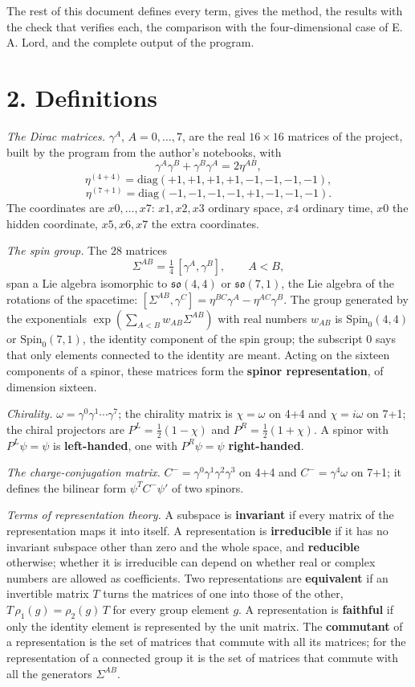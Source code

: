 \documentclass[
  10pt,
]{article}
\begin{document}
The rest of this document defines every term, gives the method, the
results with the check that verifies each, the comparison with the
four-dimensional case of E. A. Lord, and the complete output of the
program.

\hypertarget{definitions}{%
\section{2. Definitions}\label{definitions}}

\emph{The Dirac matrices.} \(\gamma^A\), \(A=0,\dots,7\), are the real
\(16\times16\) matrices of the project, built by the program from the
author's notebooks, with
\[\gamma^A\gamma^B+\gamma^B\gamma^A=2\eta^{AB},\]
\[\eta^{(4+4)}=\mathrm{diag}(+1,+1,+1,+1,-1,-1,-1,-1),\]
\[\eta^{(7+1)}=\mathrm{diag}(-1,-1,-1,-1,+1,-1,-1,-1).\] The coordinates
are \(x0,\dots,x7\): \(x1,x2,x3\) ordinary space, \(x4\) ordinary time,
\(x0\) the hidden coordinate, \(x5,x6,x7\) the extra coordinates.

\emph{The spin group.} The 28 matrices
\[\Sigma^{AB}=\tfrac14\,[\gamma^A,\gamma^B],\qquad A<B,\] span a Lie
algebra isomorphic to \(\mathfrak{so}(4,4)\) or \(\mathfrak{so}(7,1)\),
the Lie algebra of the rotations of the spacetime:
\([\Sigma^{AB},\gamma^C]=\eta^{BC}\gamma^A-\eta^{AC}\gamma^B\). The
group generated by the exponentials
\(\exp(\sum_{A<B}w_{AB}\Sigma^{AB})\) with real numbers \(w_{AB}\) is
\(\mathrm{Spin}_0(4,4)\) or \(\mathrm{Spin}_0(7,1)\), the identity
component of the spin group; the subscript 0 says that only elements
connected to the identity are meant. Acting on the sixteen components of
a spinor, these matrices form the \textbf{spinor representation}, of
dimension sixteen.

\emph{Chirality.} \(\omega=\gamma^{0}\gamma^{1}\cdots\gamma^{7}\); the
chirality matrix is \(\chi=\omega\) on 4+4 and \(\chi=i\omega\) on 7+1;
the chiral projectors are \(P^L=\tfrac12(1-\chi)\) and
\(P^R=\tfrac12(1+\chi)\). A spinor with \(P^L\psi=\psi\) is
\textbf{left-handed}, one with \(P^R\psi=\psi\) \textbf{right-handed}.

\emph{The charge-conjugation matrix.}
\(C^-=\gamma^{0}\gamma^{1}\gamma^{2}\gamma^{3}\) on 4+4 and
\(C^-=\gamma^{4}\omega\) on 7+1; it defines the bilinear form
\(\psi^TC^-\psi'\) of two spinors.

\emph{Terms of representation theory.} A subspace is \textbf{invariant}
if every matrix of the representation maps it into itself. A
representation is \textbf{irreducible} if it has no invariant subspace
other than zero and the whole space, and \textbf{reducible} otherwise;
whether it is irreducible can depend on whether real or complex numbers
are allowed as coefficients. Two representations are \textbf{equivalent}
if an invertible matrix \(T\) turns the matrices of one into those of
the other, \(T\,\rho_1(g)=\rho_2(g)\,T\) for every group element \(g\).
A representation is \textbf{faithful} if only the identity element is
represented by the unit matrix. The \textbf{commutant} of a
representation is the set of matrices that commute with all its
matrices; for the representation of a connected group it is the set of
matrices that commute with all the generators \(\Sigma^{AB}\).
\end{document}
